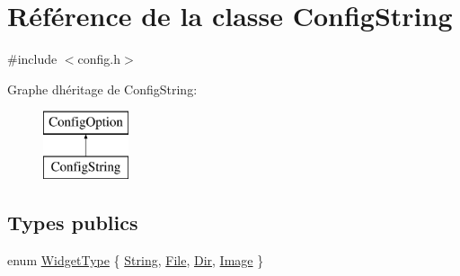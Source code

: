 \hypertarget{class_config_string}{}\section{Référence de la classe Config\+String}
\label{class_config_string}


{\ttfamily \#include $<$config.\+h$>$}

Graphe d\textquotesingle{}héritage de Config\+String\+:\begin{figure}[H]
\begin{center}
\leavevmode
\includegraphics[height=2.000000cm]{class_config_string}
\end{center}
\end{figure}
\subsection*{Types publics}
\begin{DoxyCompactItemize}
\item 
enum \hyperlink{class_config_string_a6d65e61d6dcbd73f014d16ef4b7721d1}{Widget\+Type} \{ \hyperlink{class_config_string_a6d65e61d6dcbd73f014d16ef4b7721d1a11c4b738a4bf25daac178bdcafb7ee1d}{String}, 
\hyperlink{class_config_string_a6d65e61d6dcbd73f014d16ef4b7721d1af6654c1bae7f98471bc56277441a6792}{File}, 
\hyperlink{class_config_string_a6d65e61d6dcbd73f014d16ef4b7721d1a49f5b7433b27cfc3141075bb4501bcad}{Dir}, 
\hyperlink{class_config_string_a6d65e61d6dcbd73f014d16ef4b7721d1a9612c37242b61f3f1b221ceb22be3ad0}{Image}
 \}
\end{DoxyCompactItemize}
